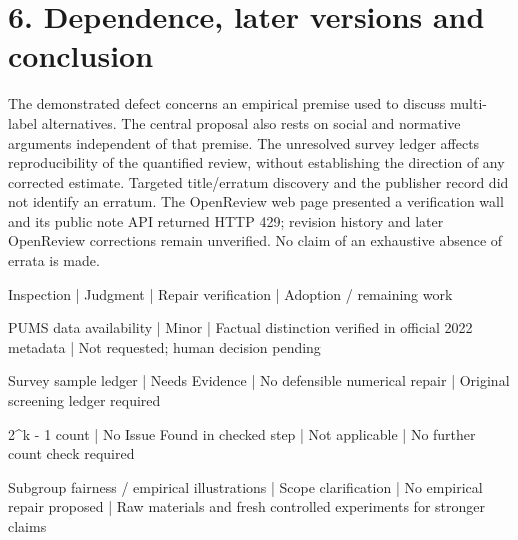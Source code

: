 \documentclass[10pt]{article}
\begin{document}
\section*{6. Dependence, later versions and conclusion}
The demonstrated defect concerns an empirical premise used to discuss multi-label alternatives. The central proposal also rests on social and normative arguments independent of that premise. The unresolved survey ledger affects reproducibility of the quantified review, without establishing the direction of any corrected estimate. Targeted title/erratum discovery and the publisher record did not identify an erratum. The OpenReview web page presented a verification wall and its public note API returned HTTP 429; revision history and later OpenReview corrections remain unverified. No claim of an exhaustive absence of errata is made.\par
Inspection | Judgment | Repair verification | Adoption / remaining work\par
PUMS data availability | Minor | Factual distinction verified in official 2022 metadata | Not requested; human decision pending\par
Survey sample ledger | Needs Evidence | No defensible numerical repair | Original screening ledger required\par
2\textasciicircum{}k - 1 count | No Issue Found in checked step | Not applicable | No further count check required\par
Subgroup fairness / empirical illustrations | Scope clarification | No empirical repair proposed | Raw materials and fresh controlled experiments for stronger claims\par
\end{document}
